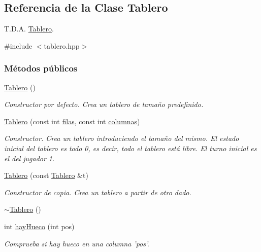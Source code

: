 \hypertarget{classTablero}{\subsection{Referencia de la Clase Tablero}
\label{classTablero}
}


T.\-D.\-A. \hyperlink{classTablero}{Tablero}.  




{\ttfamily \#include $<$tablero.\-hpp$>$}

\subsubsection*{Métodos públicos}
\begin{DoxyCompactItemize}
\item 
\hyperlink{classTablero_ab4912f28f1db392e1dd44ddc98bd4f59}{Tablero} ()
\begin{DoxyCompactList}\small\item\em Constructor por defecto. Crea un tablero de tamaño predefinido. \end{DoxyCompactList}\item 
\hyperlink{classTablero_a51ae562c7dee2909d0fa335b8c3eaf71}{Tablero} (const int \hyperlink{classTablero_a6b1f04a8502106c33bf5469f791320e6}{filas}, const int \hyperlink{classTablero_ac70289ec91b44d05da648770cc46801d}{columnas})
\begin{DoxyCompactList}\small\item\em Constructor. Crea un tablero introduciendo el tamaño del mismo. El estado inicial del tablero es todo 0, es decir, todo el tablero está libre. El turno inicial es el del jugador 1. \end{DoxyCompactList}\item 
\hyperlink{classTablero_a95ccd1353038a966ad3304ead106c0d4}{Tablero} (const \hyperlink{classTablero}{Tablero} \&t)
\begin{DoxyCompactList}\small\item\em Constructor de copia. Crea un tablero a partir de otro dado. \end{DoxyCompactList}\item 
\hyperlink{classTablero_a7d4a64967ce0bbe2cce49ec846834c84}{$\sim$\-Tablero} ()
\item 
int \hyperlink{classTablero_ada687d3c234c4fb416ca76461adf6ba4}{hay\-Hueco} (int pos)
\begin{DoxyCompactList}\small\item\em Comprueba si hay hueco en una columna 'pos'. \end{DoxyCompactList}\item 

\end{DoxyCompactItemize}

